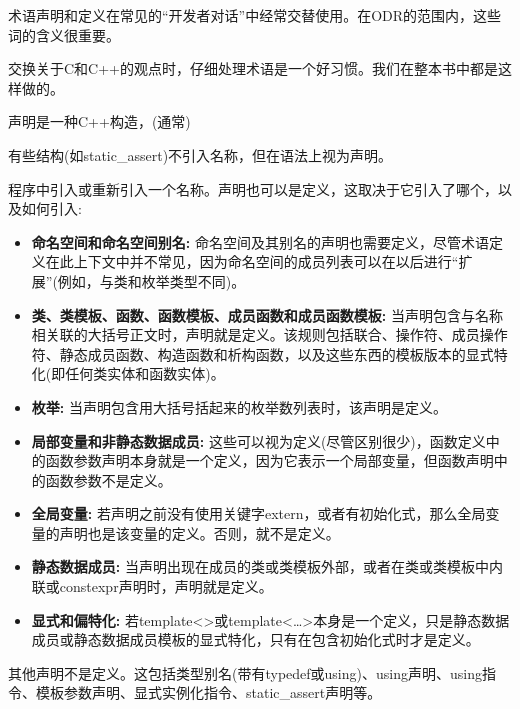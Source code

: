 术语声明和定义在常见的“开发者对话”中经常交替使用。在ODR的范围内，这些词的含义很重要。

\begin{tcolorbox}[colback=webgreen!5!white,colframe=webgreen!75!black]
\hspace*{0.75cm}交换关于C和C++的观点时，仔细处理术语是一个好习惯。我们在整本书中都是这样做的。
\end{tcolorbox}

声明是一种C++构造，(通常)

\begin{tcolorbox}[colback=webgreen!5!white,colframe=webgreen!75!black]
\hspace*{0.75cm}有些结构(如static\_assert)不引入名称，但在语法上视为声明。
\end{tcolorbox}

程序中引入或重新引入一个名称。声明也可以是定义，这取决于它引入了哪个，以及如何引入:

\begin{itemize}
\item 
\textbf{命名空间和命名空间别名:}
命名空间及其别名的声明也需要定义，尽管术语定义在此上下文中并不常见，因为命名空间的成员列表可以在以后进行“扩展”(例如，与类和枚举类型不同)。

\item 
\textbf{类、类模板、函数、函数模板、成员函数和成员函数模板: }
当声明包含与名称相关联的大括号正文时，声明就是定义。该规则包括联合、操作符、成员操作符、静态成员函数、构造函数和析构函数，以及这些东西的模板版本的显式特化(即任何类实体和函数实体)。

\item 
\textbf{枚举:}
当声明包含用大括号括起来的枚举数列表时，该声明是定义。

\item 
\textbf{局部变量和非静态数据成员:}
这些可以视为定义(尽管区别很少)，函数定义中的函数参数声明本身就是一个定义，因为它表示一个局部变量，但函数声明中的函数参数不是定义。

\item 
\textbf{全局变量:}
若声明之前没有使用关键字extern，或者有初始化式，那么全局变量的声明也是该变量的定义。否则，就不是定义。

\item 
\textbf{静态数据成员: }
当声明出现在成员的类或类模板外部，或者在类或类模板中内联或constexpr声明时，声明就是定义。

\item 
\textbf{显式和偏特化:}
若template<>或template<…>本身是一个定义，只是静态数据成员或静态数据成员模板的显式特化，只有在包含初始化式时才是定义。

\end{itemize}

其他声明不是定义。这包括类型别名(带有typedef或using)、using声明、using指令、模板参数声明、显式实例化指令、static\_assert声明等。






